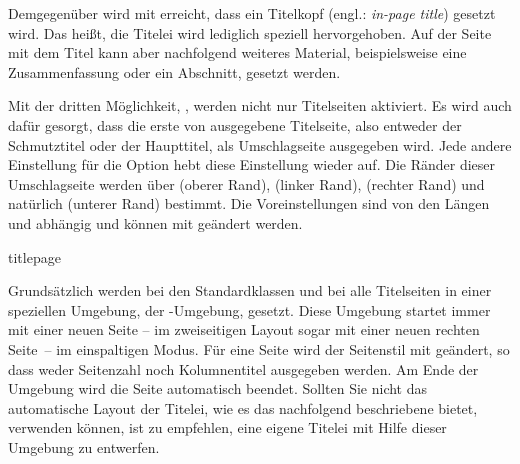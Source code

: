 Demgegenüber wird mit
erreicht, dass ein Titelkopf (engl.: \emph{in-page title}) gesetzt wird. Das
heißt, die Titelei wird lediglich speziell hervorgehoben. Auf der Seite mit
dem Titel kann aber nachfolgend weiteres Material, beispielsweise eine
Zusammenfassung oder ein Abschnitt, gesetzt werden.

Mit%
 der dritten Möglichkeit, %
, werden nicht nur
Titelseiten aktiviert. Es wird auch dafür gesorgt, dass die erste von
 ausgegebene Titelseite,
also entweder der Schmutztitel oder der Haupttitel, als
Umschlagseite ausgegeben wird. Jede andere Einstellung für die
Option  hebt diese Einstellung wieder auf. Die
Ränder dieser Umschlagseite werden
über  (oberer Rand), 
(linker Rand),  (rechter Rand) und natürlich
 (unterer Rand) bestimmt. Die Voreinstellungen
sind von den Längen  und
 abhängig und können mit
 geändert werden.

%
%
\EndIndexGroup


\begin{Declaration}
  \begin{Environment}{titlepage}\end{Environment}
\end{Declaration}%
%
Grundsätzlich werden bei den Standardklassen und bei {\KOMAScript} alle
Titelseiten in einer speziellen Umgebung, der
-Umgebung, gesetzt. Diese Umgebung startet immer mit
einer neuen Seite -- im zweiseitigen Layout sogar mit einer neuen rechten
Seite~-- im einspaltigen Modus. Für eine Seite wird der Seitenstil mit
%
geändert, so dass weder Seitenzahl noch Kolumnentitel ausgegeben werden. Am
Ende der Umgebung wird die Seite automatisch beendet. Sollten Sie nicht das
automatische Layout der Titelei, wie es das nachfolgend beschriebene
 bietet, verwenden können, ist zu
empfehlen, eine eigene Titelei mit Hilfe dieser Umgebung zu entwerfen.

